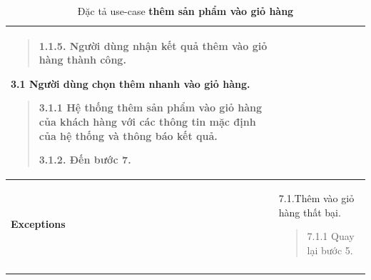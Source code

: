 \begin{longtable}{| p{} | p{} |}
\begin{quote}
            1.1.5. Người dùng nhận kết quả thêm vào giỏ hàng thành công.
        
        \end{quote}
        3.1 Người dùng chọn thêm nhanh vào giỏ hàng.
        \begin{quote}
            3.1.1 Hệ thống thêm sản phẩm vào giỏ hàng của khách hàng với các thông tin mặc định của hệ thống và thông báo kết quả.
            
            3.1.2. Đến bước 7.
        \end{quote} 
    \\
    \hline
    \begin{flushleft}
        \textbf{Exceptions} 
    \end{flushleft}
    &
    7.1.Thêm vào giỏ hàng thất bại.
        \begin{quote}
            7.1.1 Quay lại bước 5.
        \end{quote}
    \\
    \hline
    \caption{Đặc tả use-case \textbf{thêm sản phẩm vào giỏ hàng}}
    \end{longtable}


